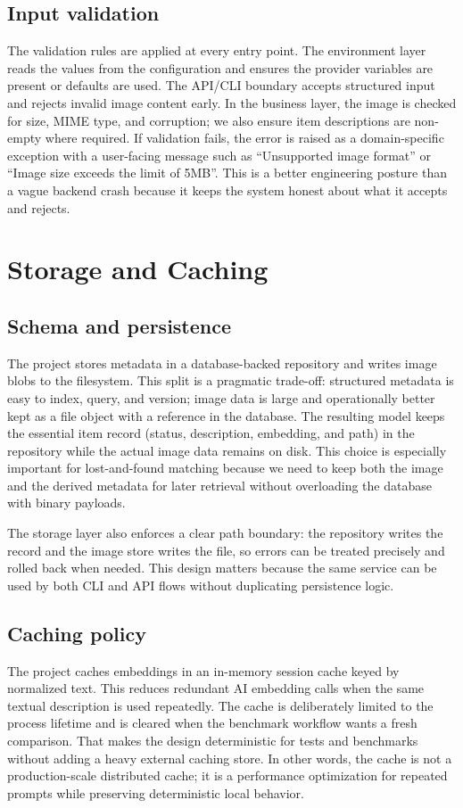 \documentclass[11pt,a4paper]{article}
\begin{document}
\subsection{Input validation}
The validation rules are applied at every entry point. The environment layer reads the values from the configuration and ensures the provider variables are present or defaults are used. The API/CLI boundary accepts structured input and rejects invalid image content early. In the business layer, the image is checked for size, MIME type, and corruption; we also ensure item descriptions are non-empty where required. If validation fails, the error is raised as a domain-specific exception with a user-facing message such as ``Unsupported image format'' or ``Image size exceeds the limit of 5MB''. This is a better engineering posture than a vague backend crash because it keeps the system honest about what it accepts and rejects.

\section{Storage and Caching}
\subsection{Schema and persistence}
The project stores metadata in a database-backed repository and writes image blobs to the filesystem. This split is a pragmatic trade-off: structured metadata is easy to index, query, and version; image data is large and operationally better kept as a file object with a reference in the database. The resulting model keeps the essential item record (status, description, embedding, and path) in the repository while the actual image data remains on disk. This choice is especially important for lost-and-found matching because we need to keep both the image and the derived metadata for later retrieval without overloading the database with binary payloads.

The storage layer also enforces a clear path boundary: the repository writes the record and the image store writes the file, so errors can be treated precisely and rolled back when needed. This design matters because the same service can be used by both CLI and API flows without duplicating persistence logic.

\subsection{Caching policy}
The project caches embeddings in an in-memory session cache keyed by normalized text. This reduces redundant AI embedding calls when the same textual description is used repeatedly. The cache is deliberately limited to the process lifetime and is cleared when the benchmark workflow wants a fresh comparison. That makes the design deterministic for tests and benchmarks without adding a heavy external caching store. In other words, the cache is not a production-scale distributed cache; it is a performance optimization for repeated prompts while preserving deterministic local behavior.
\end{document}
